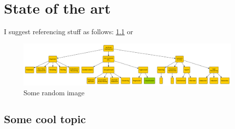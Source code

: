 
\chapter{State of the art}
\label{chap:stateofart}

I suggest referencing stuff as follows: \cref{fig:random-image} or 

\begin{figure}
    \centering
    \includegraphics[width=.8\linewidth]{figures/random-image}
    \caption{Some random image}
    \label{fig:random-image}
\end{figure}

\section{Some cool topic}


